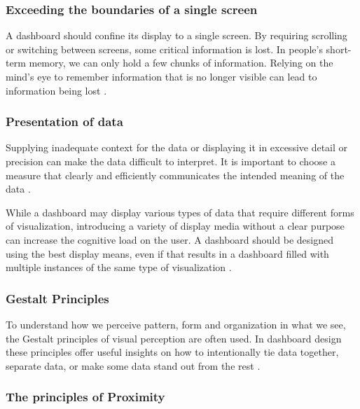 \subsubsection{Exceeding the boundaries of a single screen}
\label{subsubsec:single_screen_boundaries}


A dashboard should confine its display to a single screen. By requiring scrolling or switching between screens, some critical information is lost. In people's short-term memory, we can only hold a few chunks of information. Relying on the mind’s eye to remember information that is no longer visible can lead to information being lost \autocite[p. 39-40]{FewDashboard}.

\subsubsection{Presentation of data}
\label{subsubsec:presentation_of_data}


Supplying inadequate context for the data or displaying it in excessive detail or precision can make the data difficult to interpret. It is important to choose a measure that clearly and efficiently communicates the intended meaning of the data \autocite[p. 43-45]{FewDashboard}.

While a dashboard may display various types of data that require different forms of visualization, introducing a variety of display media without a clear purpose can increase the cognitive load on the user. A dashboard should be designed using the best display means, even if that results in a dashboard filled with multiple instances of the same type of visualization \autocite[p. 50-51]{FewDashboard}.

\subsubsection{Gestalt Principles}
\label{subsubsec:gestalt_principles}


To understand how we perceive pattern, form and organization in what we see, the Gestalt principles of visual perception are often used. In dashboard design these principles offer useful insights on how to intentionally tie data together, separate data, or make some data stand out from the rest \autocite[p. 74]{FewDashboard}.

\subsubsection{The principles of Proximity}
\label{subsubsec:principle_proximity}


